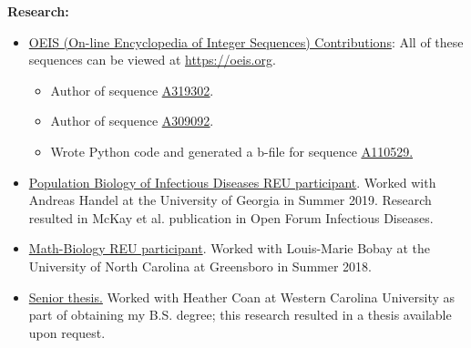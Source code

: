 \textbf{Research:}

\begin{itemize}[noitemsep]
\item \ul{OEIS (On-line Encyclopedia of Integer Sequences) Contributions}: All of these sequences can be viewed at \url{https://oeis.org}.
	\begin{itemize}[noitemsep]
		\item Author of sequence \href{https://oeis.org/A319302}{\ul{A319302}}.
		\item Author of sequence \href{https://oeis.org/A309092}{\ul{A309092}}.
		\item Wrote Python code and generated a b-file for sequence \href{https://oeis.org/A110529}{\ul{A110529}.}
	\end{itemize}
\item \ul{Population Biology of Infectious Diseases REU participant}. Worked with Andreas Handel at the University of Georgia in Summer 2019. Research resulted in McKay et al. publication in Open Forum Infectious Diseases.
\item \underline{Math-Biology REU participant}. Worked with Louis-Marie Bobay at the University of North Carolina at Greensboro in Summer 2018.
\item \ul{Senior thesis.} Worked with Heather Coan at Western Carolina University as part of obtaining my B.S. degree; this research resulted in a thesis available upon request.


\end{itemize}
